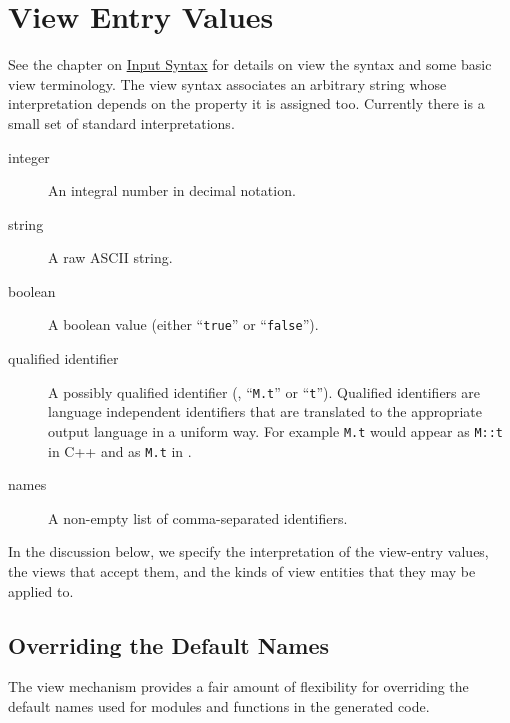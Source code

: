 \section{View Entry Values}

See the chapter on \hyperref[chap:syntax]{Input Syntax} for details on
view the syntax and some basic view terminology.
The view syntax associates
an arbitrary string whose interpretation depends on the property it is
assigned too.
Currently there is a small set of standard interpretations.
%
\begin{description}
  \item[integer]
    An integral number in decimal notation.
  \item[string]
    A raw ASCII string.
  \item[boolean]
    A boolean value (either ``\lstinline!true!'' or ``\lstinline!false!'').
  \item[qualified identifier]
    A possibly qualified identifier (\eg{}, ``\lstinline!M.t!'' or ``\lstinline!t!'').
    Qualified identifiers are language independent
    identifiers that are translated to the appropriate output language in a
    uniform way.
    For example \lstinline!M.t! would appear as \lstinline!M::t! in C++ and as
    \lstinline!M.t! in \sml{}.
  \item[names]
    A non-empty list of comma-separated identifiers.
\end{description}%

In the discussion below, we specify the interpretation of the view-entry values,
the views that accept them, and the kinds of view entities that they may be applied to.

\newcommand{\PROP}[4]{%
  \item[\fbox{\texttt{#1}~~\normalfont\textit{#2}}]\hfill{\fbox{#3 / #4}}\\[0.25em] }

\subsection{Overriding the Default Names}
The view mechanism provides a fair amount of flexibility for overriding the
default names used for modules and functions in the generated code.

